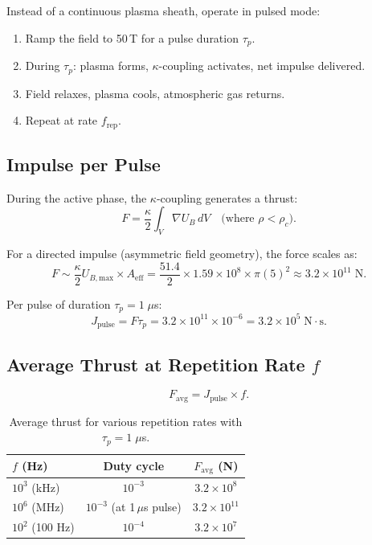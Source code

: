 \documentclass[12pt,a4paper]{article}
\begin{document}
Instead of a continuous plasma sheath, operate in pulsed mode:
\begin{enumerate}
  \item Ramp the field to 50\,T for a pulse duration $\tau_p$.
  \item During $\tau_p$: plasma forms, $\kappa$-coupling activates, net impulse delivered.
  \item Field relaxes, plasma cools, atmospheric gas returns.
  \item Repeat at rate $f_{\text{rep}}$.
\end{enumerate}

\subsection{Impulse per Pulse}

During the active phase, the $\kappa$-coupling generates a thrust:
\begin{equation}
  F = \frac{\kappa}{2} \int_V \nabla U_B \, dV \quad \text{(where $\rho < \rho_c$)}.
\end{equation}

For a directed impulse (asymmetric field geometry), the force scales as:
\begin{equation}
  F \sim \frac{\kappa}{2} U_{B,\text{max}} \times A_{\text{eff}}
    = \frac{51.4}{2} \times 1.59\times10^8 \times \pi(5)^2
    \approx 3.2 \times 10^{11} \; \text{N}.
\end{equation}

Per pulse of duration $\tau_p = 1\;\mu$s:
\begin{equation}
  J_{\text{pulse}} = F \tau_p = 3.2\times10^{11} \times 10^{-6} = 3.2 \times 10^5 \; \text{N}\cdot\text{s}.
\end{equation}

\subsection{Average Thrust at Repetition Rate $f$}

\begin{equation}
  F_{\text{avg}} = J_{\text{pulse}} \times f.
\end{equation}

\begin{table}[h]
\centering
\begin{tabular}{@{}lcc@{}}
\toprule
$f$ (Hz) & Duty cycle & $F_{\text{avg}}$ (N) \\
\midrule
$10^3$ (kHz) & $10^{-3}$ & $3.2 \times 10^8$ \\
$10^6$ (MHz) & $10^{-3}$ (at 1\,$\mu$s pulse) & $3.2 \times 10^{11}$ \\
$10^2$ (100 Hz) & $10^{-4}$ & $3.2 \times 10^7$ \\
\bottomrule
\end{tabular}
\caption{Average thrust for various repetition rates with $\tau_p = 1\;\mu$s.}
\end{table}
\end{document}
